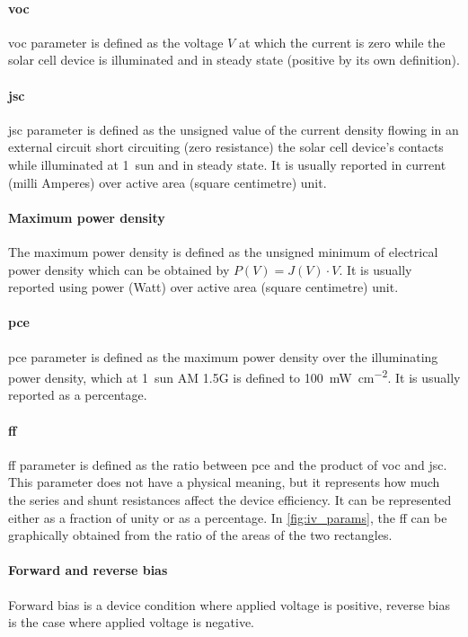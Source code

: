 		\paragraph{\Glsdesc{voc}}
		\Gls{voc} parameter is defined as the voltage $V$ at which the current is zero while the solar cell device is illuminated and in steady state (positive by its own definition).

		\paragraph{\Glsdesc{jsc}}
		\Gls{jsc} parameter is defined as the unsigned value of the current density flowing in an external circuit short circuiting (zero resistance) the solar cell device's contacts while illuminated at 1~sun and in steady state.
		It is usually reported in current (milli Amperes) over active area (square centimetre) unit.

		\paragraph{Maximum power density}
		The maximum power density is defined as the unsigned minimum of electrical power density which can be obtained by $P(V) = J(V) \cdot V$.
		It is usually reported using power (Watt) over active area (square centimetre) unit.

		\paragraph{\Glsdesc{pce}}
		\Gls{pce} parameter is defined as the maximum power density over the illuminating power density, which at 1~sun AM 1.5G is defined to \SI{100}{\mW\per\square\cm}.
		It is usually reported as a percentage.

		\paragraph{\Glsdesc{ff}}\label{characterization_ff}
		\Gls{ff} parameter is defined as the ratio between \gls{pce} and the product of \gls{voc} and \gls{jsc}.
		This parameter does not have a physical meaning, but it represents how much the series and shunt resistances affect the device efficiency.
		It can be represented either as a fraction of unity or as a percentage.
		In \cref{fig:iv_params}, the \gls{ff} can be graphically obtained from the ratio of the areas of the two rectangles.

		\paragraph{Forward and reverse bias}
		Forward bias is a device condition where applied voltage is positive, reverse bias is the case where applied voltage is negative.

